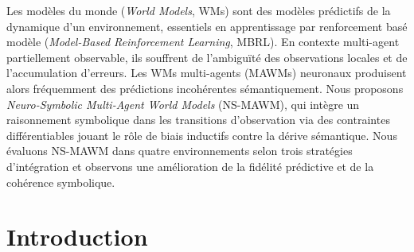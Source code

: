 \documentclass[final]{jfsma}
\theoremstyle{plain}
\theoremstyle{definition}
\theoremstyle{remark}
\begin{document}
\maketitle

\begin{resume}
  Les modèles du monde (\emph{World Models}, WMs) sont des modèles prédictifs de la dynamique d'un environnement, essentiels en apprentissage par renforcement basé modèle (\emph{Model-Based Reinforcement Learning}, MBRL). En contexte multi-agent partiellement observable, ils souffrent de l'ambiguïté des observations locales et de l'accumulation d'erreurs. Les WMs multi-agents (MAWMs) neuronaux produisent alors fréquemment des prédictions incohérentes sémantiquement. Nous proposons \textit{Neuro-Symbolic Multi-Agent World Models} (NS-MAWM), qui intègre un raisonnement symbolique dans les transitions d'observation via des contraintes différentiables jouant le rôle de biais inductifs contre la dérive sémantique. Nous évaluons NS-MAWM dans quatre environnements selon trois stratégies d'intégration et observons une amélioration de la fidélité prédictive et de la cohérence symbolique.
\end{resume}


\bigskip

\begin{abstract}
  World models (WMs) are predictive models of environmental dynamics, essential in model-based reinforcement learning (MBRL). In partially observable multi-agent contexts, they suffer from ambiguity in local observations and error accumulation. Neural multi-agent WMs (MAWMs) thus frequently produce semantically inconsistent predictions. We propose Neuro-Symbolic Multi-Agent World Models (NS-MAWM), which integrates symbolic reasoning into observation transitions via differentiable constraints acting as inductive biases against semantic drift. We evaluate NS-MAWM in four environments using three integration strategies and observe improvements in predictive accuracy and symbolic consistency.
\end{abstract}


\section{Introduction}
\label{sec:intro}
\end{document}
